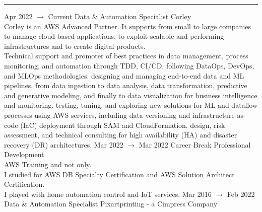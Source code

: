 \documentclass[8pt]{stackoverflow-upgraded-version} %
\begin{document}
\textcolor{stackoverflow}{\hrule}
\vspace{\baselineskip} %
\begin{entrylist}
	\entry
		{Apr 2022 $\rightarrow$ Current}
		{Data \& Automation Specialist}
		{Corley}
		{\\
		 Corley is an AWS Advanced Partner. It supports from small to large companies to manage cloud-based applications,
		to exploit scalable and performing infrastructures and to create digital products.\vspace{1mm}\\
		 Technical support and promoter of best practices in data management, process monitoring, and automation through TDD, CI/CD, following DataOps, DevOps, and MLOps methodologies.
		 designing and managing end-to-end data and ML pipelines, from data ingestion to data analysis, data transformation, predictive and generative modeling, and finally to data visualization for business intelligence and monitoring.
		 testing, tuning, and exploring new solutions for ML and dataflow processes using AWS services, including data versioning and infrastructure-as-code (IaC) deployment through SAM and CloudFormation.
		 design, risk assessment, and technical consulting for high availability (HA) and disaster recovery (DR) architectures.}
	\entry
		{Mar 2022 $\rightarrow$ Mar 2022}
		{Career Break}
		{Professional Development}
		{\\
		AWS Training and not only.\\
		I studied for AWS DB Specialty Certification and AWS Solution Architect Certification.\\
		I played with home automation control and IoT services.}
	\entry
		{Mar 2016 $\rightarrow$ Feb 2022}
		{Data \& Automation Specialist}
		{Pixartprinting - a Cimpress Company}
		{\\
}
\end{entrylist}
\end{document}
